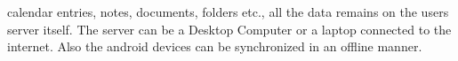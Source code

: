 calendar entries, notes, documents, folders etc., all the data remains on the users server itself.
The server can be a Desktop Computer or a laptop connected to the internet. Also the android
devices can be synchronized in an offline manner.\\[0.5cm]
